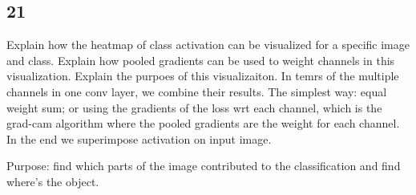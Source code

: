 \documentclass{article}
\begin{document}
\subsection*{21}
\begin{myleftlinebox}
    Explain how the heatmap of class activation can be visualized for a specific image and class. Explain how pooled gradients can be used to weight channels in this visualization. Explain the purpoes of this visualizaiton.
    \tcbline
    In temrs of the multiple channels in one conv layer, we combine their results. The simplest way: equal weight sum; or using the gradients of the loss wrt each channel, which is the grad-cam algorithm where the pooled gradients are the weight for each channel. In the end we superimpose activation on input image.

    Purpose: find which parts of the image contributed to the classification and find where's the object.
\end{myleftlinebox}
\end{document}
